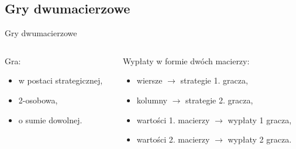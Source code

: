 \documentclass[xcolor=x11names,compress]{beamer}
\renewcommand{\(}{\begin{columns}}
\renewcommand{\)}{\end{columns}}
\newcommand{\<}[1]{\begin{column}{#1}}
\renewcommand{\>}{\end{column}}
\begin{document}
\subsection{Gry dwumacierzowe}
\begin{frame}{Gry dwumacierzowe}
\begin{columns}[c]
\begin{column}{.5\textwidth}
Gra:
\begin{itemize}
\item w postaci strategicznej,
\item 2-osobowa,
\item o sumie dowolnej.
\end{itemize}
\end{column}
\begin{column}{.5\textwidth}
Wypłaty w formie dwóch macierzy:
\begin{itemize}
\item wiersze $\rightarrow$ strategie 1. gracza,
\item kolumny $\rightarrow$ strategie 2. gracza,
\item wartości 1. macierzy $\rightarrow$ wypłaty 1 gracza,
\item wartości 2. macierzy $\rightarrow$ wypłaty 2 gracza.
\end{itemize} 
\end{column}
\end{columns}
\end{frame}

\end{document}
